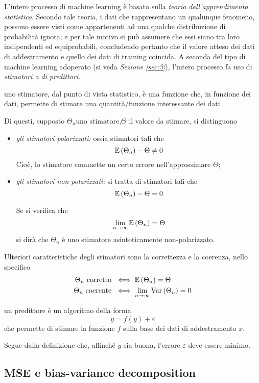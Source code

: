 \documentclass{subfiles}
\begin{document}
\label{sec:2}
L'intero processo di machine learning è basato sulla \emph{teoria dell'apprendimento statistico}.
Secondo tale teoria, i dati che rappresentano un qualunque fenomeno, possono essere visti come appartenenti ad una qualche distribuzione di probabilità ignota;
e per tale motivo si può assumere che essi siano tra loro indipendenti ed equiprobabili,
concludendo pertanto che il valore atteso dei dati di addestramento e quello dei dati di training coincida.
A seconda del tipo di machine learning adoperato (si veda \emph{Sezione \ref{sec:3}}), l'intero processo fa uso di \emph{stimatori \emph{o di} predittori}.
\begin{Definition*}
    uno stimatore, dal punto di vista statistico, è una funzione che, in funzione dei dati, permette di stimare una quantità/funzione interessante dei dati.
\end{Definition*}
Di questi, supposto $\Theta_{n} \text{uno stimatore,} \Theta$ il valore da stimare, si distinguono
\begin{itemize}
    \item \emph{gli stimatori polarizzati:} ossia stimatori tali che
          $$
              \Expected{\Theta_{n}} - \Theta \neq 0
          $$
          Cioè, lo stimatore commette un certo errore nell'approssimare $\Theta$;

    \item \emph{gli stimatori non-polarizzati:} si tratta di stimatori tali che
          $$
              \Expected{\Theta_{n}} - \Theta = 0
          $$
          \begin{Remark*}
              Se si verifica che
              $$
                  \Lim{n}{\infty}{\Expected{\Theta_{n}}} = \Theta
              $$
              si dirà che $\Theta_{n}$ è uno stimatore asintoticamente non-polarizzato.
          \end{Remark*}
\end{itemize}
Ulteriori caratteristiche degli stimatori sono la correttezza e la coerenza, nello specifico
$$\begin{aligned}
        \Theta_{n} \text{corretto} & \iff \Expected{\Theta_{n}} = \Theta        \\
        \Theta_{n} \text{coerente} & \iff \Lim{n}{\infty}{\Var{\Theta_{n}}} = 0
    \end{aligned}$$
\begin{Definition*}
    un predittore è un algoritmo della forma
    $$
        y = f(y) + \varepsilon
    $$
    che permette di stimare la funzione $f$ sulla base dei dati di addestramento $x$.
\end{Definition*}
Segue dalla definizione che, affinché $y$ sia buona, l'errore $\varepsilon$ deve essere minimo.

\subsection{MSE e bias-variance decomposition}

\clearpage
\end{document}
